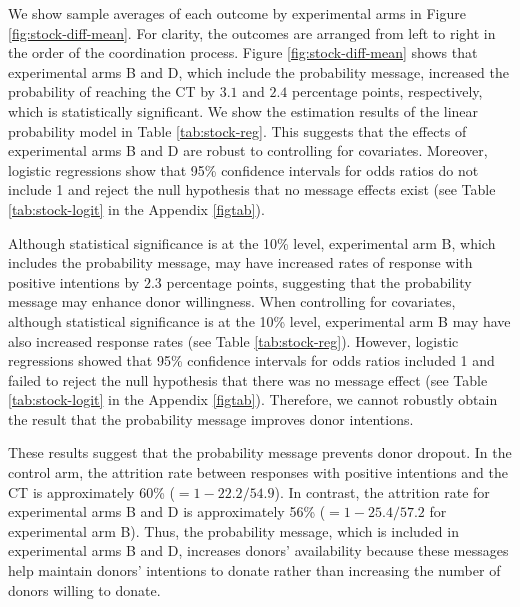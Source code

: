 \documentclass[12pt, a4paper]{article}
\begin{document}
We show sample averages of each outcome by experimental arms in Figure \ref{fig:stock-diff-mean}. For clarity, the outcomes are arranged from left to right in the order of the coordination process. Figure \ref{fig:stock-diff-mean} shows that experimental arms B and D, which include the probability message, increased the probability of reaching the CT by \(3.1\) and \(2.4\) percentage points, respectively, which is statistically significant. We show the estimation results of the linear probability model in Table \ref{tab:stock-reg}. This suggests that the effects of experimental arms B and D are robust to controlling for covariates. Moreover, logistic regressions show that 95\% confidence intervals for odds ratios do not include 1 and reject the null hypothesis that no message effects exist (see Table \ref{tab:stock-logit} in the Appendix \ref{figtab}).

Although statistical significance is at the 10\% level, experimental arm B, which includes the probability message, may have increased rates of response with positive intentions by \(2.3\) percentage points, suggesting that the probability message may enhance donor willingness. When controlling for covariates, although statistical significance is at the 10\% level, experimental arm B may have also increased response rates (see Table \ref{tab:stock-reg}). However, logistic regressions showed that 95\% confidence intervals for odds ratios included 1 and failed to reject the null hypothesis that there was no message effect (see Table \ref{tab:stock-logit} in the Appendix \ref{figtab}). Therefore, we cannot robustly obtain the result that the probability message improves donor intentions.

These results suggest that the probability message prevents donor dropout. In the control arm, the attrition rate between responses with positive intentions and the CT is approximately 60\% (\(=1 - 22.2/54.9\)). In contrast, the attrition rate for experimental arms B and D is approximately 56\% (\(=1 - 25.4/57.2\) for experimental arm B). Thus, the probability message, which is included in experimental arms B and D, increases donors' availability because these messages help maintain donors' intentions to donate rather than increasing the number of donors willing to donate.
\end{document}
